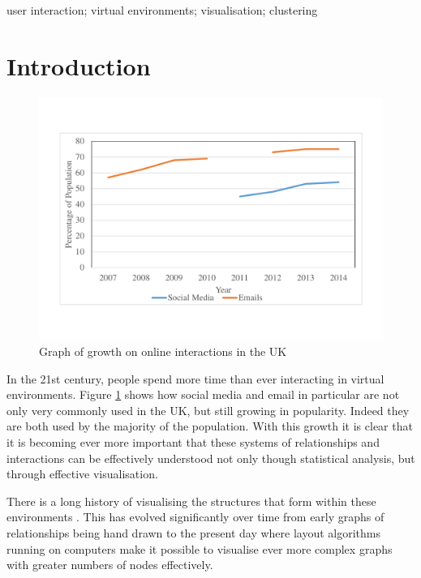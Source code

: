 \documentclass[12pt,a4paper]{article}
\begin{document}
\begin{keywords}
user interaction; virtual environments; visualisation; clustering
\end{keywords}

\section{Introduction}

\begin{figure}[htb]
\centering
\caption{Graph of growth on online interactions in the UK \protect\cite{ons}}
\label{fig:interactions}
\includegraphics[scale=0.4]{Chart.pdf}
\end{figure}

\noindent   
In the 21st century, people spend more time than ever interacting in virtual environments. Figure \ref{fig:interactions} shows how social media and email in particular are not only very commonly used in the UK, but still growing in popularity. Indeed they are both used by the majority of the population. With this growth it is clear that it is becoming ever more important that these systems of relationships and interactions can be effectively understood not only though statistical analysis, but through effective visualisation.

There is a long history of visualising the structures that form within these environments \cite{freeman2000visualizing}. This has evolved significantly over time from early graphs of relationships being hand drawn to the present day where layout algorithms running on computers make it possible to visualise ever more complex graphs with greater numbers of nodes effectively. 
\end{document}
